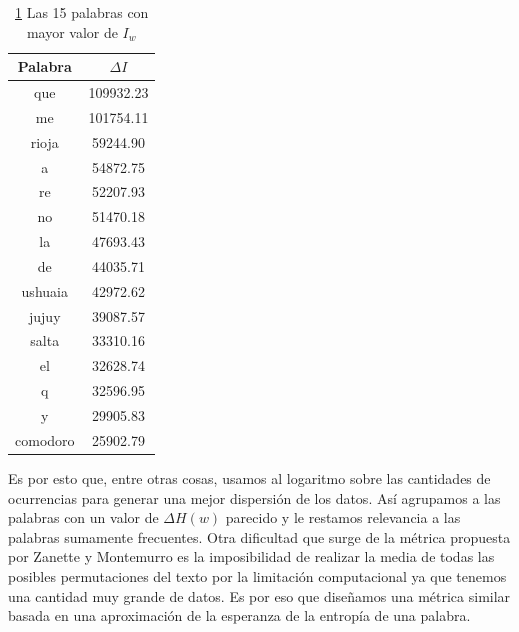 \begin{table}[ht]
\centering

\begin{tabular}{ c c }
\toprule
Palabra  & $\Delta I$                      \\
\midrule
que      & 109932.23                         \\
me       & 101754.11                        \\
rioja    & 59244.90                          \\
a        & 54872.75                          \\
re       & 52207.93                          \\
no       & 51470.18                          \\
la       & 47693.43                          \\
de       & 44035.71                          \\
ushuaia  & 42972.62                          \\
jujuy    & 39087.57                          \\
salta    & 33310.16                          \\
el       & 32628.74                          \\
q        & 32596.95                          \\
y        & 29905.83                          \\
comodoro & 25902.79                         \\
\bottomrule
\end{tabular}
\caption{\ref{tab:zanette} Las 15 palabras con mayor valor de $I_w$ }
\label{tab:zanette}
\end{table}

Es por esto que, entre otras cosas, usamos al logaritmo sobre las cantidades de ocurrencias para generar una mejor dispersión de los datos. Así agrupamos a las palabras con un valor de $\Delta H(w)$ parecido y le restamos relevancia a las palabras sumamente frecuentes. Otra dificultad que surge de la métrica propuesta por Zanette y Montemurro es la imposibilidad de realizar la media de todas las posibles permutaciones del texto por la limitación computacional ya que 
tenemos una cantidad muy grande de datos. Es por eso que diseñamos una métrica similar basada en una aproximación de la esperanza de la entropía de una palabra.

